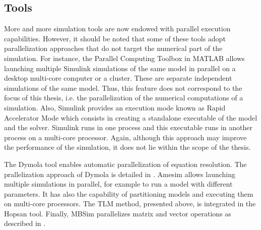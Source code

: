 \subsection{Tools}

More and more simulation tools are now endowed with parallel execution capabilities. However, it should be noted that some of these tools adopt parallelization approaches that do not target the numerical part of the simulation. For instance, the Parallel Computing Toolbox in MATLAB allows launching multiple Simulink simulations of the same model in parallel on a desktop multi-core computer or a cluster. These are separate independent simulations of the same model. Thus, this feature does not correspond to the focus of this thesis, i.e. the parallelization of the numerical computations of a simulation. Also, Simulink provides an execution mode known as Rapid Accelerator Mode which consists in creating a standalone executable of the model and the solver. Simulink runs in one process and this executable runs in another process on a multi-core processor. Again, although this approach may improve the performance of the simulation, it does not lie within the scope of the thesis.

The Dymola tool enables automatic parallelization of equation resolution. The prallelization approach of Dymola is detailed in \cite{elmqvist:2014}. Amesim allows launching multiple simulations in parallel, for example to run a model with different parameters. It has also the capability of partitioning models and executing them on multi-core processors. The TLM method, presented above, is integrated in the Hopsan tool. Finally, MBSim parallelizes matrix and vector operations as described in \cite{clauberg:2012}. 